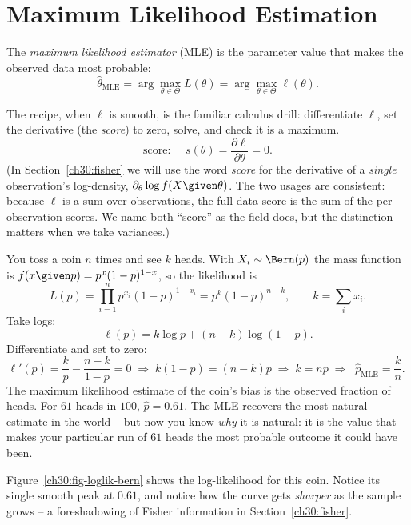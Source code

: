\section{Maximum Likelihood Estimation}
\label{ch30:mle}

\begin{definition}
\label{ch30:def-mle}
The \emph{maximum likelihood estimator} (MLE) is the parameter value that makes
the observed data most probable:
\[
  \hat\theta_{\mathrm{MLE}} = \arg\max_{\theta \in \Theta} L(\theta)
                            = \arg\max_{\theta \in \Theta} \ell(\theta).
\]
\end{definition}

The recipe, when $\ell$ is smooth, is the familiar calculus drill: differentiate
$\ell$, set the derivative (the \emph{score}) to zero, solve, and check it is a
maximum.
\[
  \text{score: } \quad s(\theta) = \frac{\partial \ell}{\partial \theta} = 0.
\]
(In Section~\ref{ch30:fisher} we will use the word \emph{score} for the
derivative of a \emph{single} observation's log-density,
$\partial_\theta\log f(X\given\theta)$. The two usages are consistent: because
$\ell$ is a sum over observations, the full-data score is the sum of the
per-observation scores. We name both ``score'' as the field does, but the
distinction matters when we take variances.)

\begin{example}
\label{ch30:ex-mle-bern}
You toss a coin $n$ times and see $k$ heads. With $X_i\sim\Bern(p)$ the mass
function is $f(x\given p)=p^x(1-p)^{1-x}$, so the likelihood is
\[
  L(p) = \prod_{i=1}^n p^{x_i}(1-p)^{1-x_i} = p^{k}(1-p)^{n-k},
  \qquad k = \sum_i x_i.
\]
Take logs:
\[
  \ell(p) = k\log p + (n-k)\log(1-p).
\]
Differentiate and set to zero:
\[
  \ell'(p) = \frac{k}{p} - \frac{n-k}{1-p} = 0
  \;\Longrightarrow\;
  k(1-p) = (n-k)p
  \;\Longrightarrow\;
  k = np
  \;\Longrightarrow\;
  \boxed{\;\hat p_{\mathrm{MLE}} = \frac{k}{n}.\;}
\]
The maximum likelihood estimate of the coin's bias is the observed fraction of
heads. For $61$ heads in $100$, $\hat p = 0.61$. The MLE recovers the most
natural estimate in the world -- but now you know \emph{why} it is natural: it
is the value that makes your particular run of $61$ heads the most probable
outcome it could have been.
\end{example}

Figure~\ref{ch30:fig-loglik-bern} shows the log-likelihood for this coin. Notice
its single smooth peak at $0.61$, and notice how the curve gets \emph{sharper}
as the sample grows -- a foreshadowing of Fisher information in
Section~\ref{ch30:fisher}.

